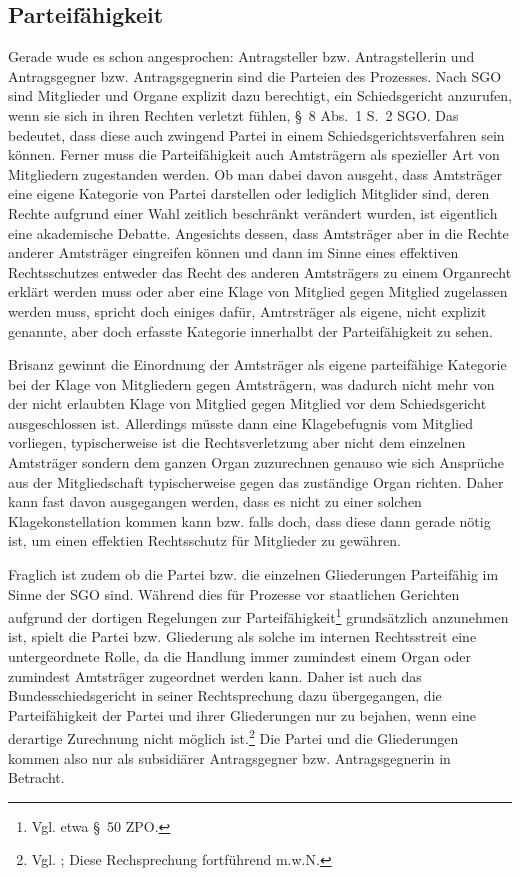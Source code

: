 \subsection{Parteifähigkeit}
\label{Anrufung:Statthaftigkeit:Parteifaehigkeit}
Gerade wude es schon angesprochen: Antragsteller bzw. Antragstellerin und Antragsgegner bzw. Antragsgegnerin sind die Parteien des Prozesses.
Nach SGO sind Mitglieder und Organe explizit dazu berechtigt, ein Schiedsgericht anzurufen, wenn sie sich in ihren Rechten verletzt fühlen, \S~8 Abs.~1 S.~2 SGO.
Das bedeutet, dass diese auch zwingend Partei in einem Schiedsgerichtsverfahren sein können.
Ferner muss die Parteifähigkeit auch Amtsträgern als spezieller Art von Mitgliedern zugestanden werden.
Ob man dabei davon ausgeht, dass Amtsträger eine eigene Kategorie von Partei darstellen oder lediglich Mitglider sind, deren Rechte aufgrund einer Wahl zeitlich beschränkt verändert wurden, ist eigentlich eine akademische Debatte.
Angesichts dessen, dass Amtsträger aber in die Rechte anderer Amtsträger eingreifen können und dann im Sinne eines effektiven Rechtsschutzes entweder das Recht des anderen Amtsträgers zu einem Organrecht erklärt werden muss oder aber eine Klage von Mitglied gegen Mitglied zugelassen werden muss, spricht doch einiges dafür, Amtrsträger als eigene, nicht explizit genannte,  aber doch erfasste Kategorie innerhalbt der Parteifähigkeit zu sehen.

Brisanz gewinnt die Einordnung der Amtsträger als eigene parteifähige Kategorie bei der Klage von Mitgliedern gegen Amtsträgern, was dadurch nicht mehr von der nicht erlaubten Klage von Mitglied gegen Mitglied vor dem Schiedsgericht ausgeschlossen ist.
Allerdings müsste dann eine Klagebefugnis vom Mitglied vorliegen, typischerweise ist die Rechtsverletzung aber nicht dem  einzelnen Amtsträger sondern dem ganzen Organ zuzurechnen genauso wie sich Ansprüche aus der Mitgliedschaft typischerweise gegen das zuständige Organ richten. 
Daher kann fast davon ausgegangen werden, dass es nicht zu einer solchen Klagekonstellation kommen kann bzw. falls doch, dass diese dann gerade nötig ist, um einen effektien Rechtsschutz für Mitglieder zu gewähren.

Fraglich ist zudem ob die Partei bzw. die einzelnen Gliederungen Parteifähig im Sinne der SGO sind.
Während dies für Prozesse vor staatlichen Gerichten aufgrund der dortigen Regelungen zur Parteifähigkeit\footnote{Vgl. etwa \S~50 ZPO.} grundsätzlich anzunehmen ist, spielt die Partei bzw. Gliederung als solche im internen Rechtsstreit eine untergeordnete Rolle, da die Handlung immer zumindest einem Organ oder zumindest Amtsträger zugeordnet werden kann.
Daher ist auch das Bundesschiedsgericht in seiner Rechtsprechung dazu übergegangen, die Parteifähigkeit der Partei und ihrer Gliederungen nur zu bejahen, wenn eine derartige Zurechnung nicht möglich ist.\footnote{Vgl. \cite[S. 4]{BSG1614HS}; Diese Rechsprechung fortführend \cite[S. 2]{BSG3815HS} m.w.N.}
Die Partei und die Gliederungen kommen also nur als subsidiärer Antragsgegner bzw. Antragsgegnerin in Betracht.

